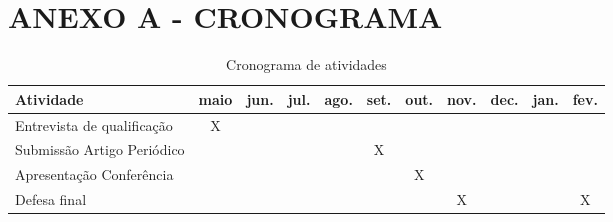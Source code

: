 
\renewcommand{\thechapter}{}%
\chapter{ANEXO A - CRONOGRAMA}
\label{anexoA}
\renewcommand{\thechapter}{A}

\begin{table}[!ht]
  \label{tab:cronograma}
  \begin{center}
	\caption{Cronograma de atividades}
	\begin{tabular*}{\textwidth}{|p{3cm}|c|c|c|c|c|c|c|c|c|c|} %
		\hline
		\textbf{Atividade} & maio & jun. & jul. & ago. & set. & out. & nov. & dec. & jan. & fev. \\
		\hline
		\midrule
		Entrevista de qualificação &X&&&&&&&&& \\
		\hline
		Submissão Artigo Periódico &&&&&X&&&&& \\
		\hline
		Apresentação Conferência &&&&&&X&&&& \\
		\hline
		Defesa final &&&&&&&X&&&X \\
		\bottomrule
		\hline
	\end{tabular*}
   \end{center}
\end{table}

